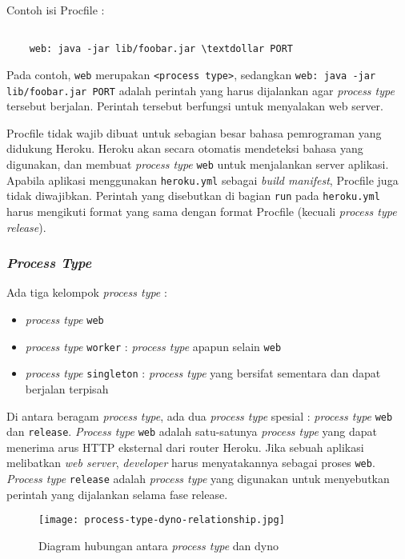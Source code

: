 Contoh isi Procfile :
\begin{lstlisting}

	web: java -jar lib/foobar.jar \textdollar PORT

\end{lstlisting}

Pada contoh, \texttt{web} merupakan \texttt{<process type>}, sedangkan \texttt{web: java -jar lib/foobar.jar \textdollar PORT} adalah perintah yang harus dijalankan agar \textit{process type} tersebut berjalan. Perintah tersebut berfungsi untuk menyalakan web server.

Procfile tidak wajib dibuat untuk sebagian besar bahasa pemrograman yang didukung Heroku. Heroku akan secara otomatis mendeteksi bahasa yang digunakan, dan membuat \textit{process type} \texttt{web} untuk menjalankan server aplikasi. Apabila aplikasi menggunakan \texttt{heroku.yml} sebagai \textit{build manifest}, Procfile juga tidak diwajibkan. Perintah yang disebutkan di bagian \texttt{run} pada \texttt{heroku.yml} harus mengikuti format yang sama dengan format Procfile (kecuali \textit{process type} \textit{release}).


\subsubsection{\textit{Process Type}}
Ada tiga kelompok \textit{process type} : 
\begin{itemize}
\item \textit{process type} \texttt{web}
\item \textit{process type} \texttt{worker} : \textit{process type} apapun selain \texttt{web}
\item \textit{process type} \texttt{singleton} : \textit{process type} yang bersifat sementara dan dapat berjalan terpisah
\end{itemize}

Di antara beragam \textit{process type}, ada dua \textit{process type} spesial : \textit{process type} \texttt{web} dan \texttt{release}. \textit{Process type} \texttt{web} adalah satu-satunya \textit{process type} yang dapat menerima arus HTTP eksternal dari router Heroku. Jika sebuah aplikasi melibatkan \textit{web server}, \textit{developer} harus menyatakannya sebagai proses \texttt{web}. \textit{Process type} \texttt{release} adalah \textit{process type} yang digunakan untuk menyebutkan perintah yang dijalankan selama fase release.

\begin{figure}[H]
	\centering  
	\texttt{[image: process-type-dyno-relationship.jpg]}  
	\caption[Diagram hubungan antara \textit{process type} dan dyno]{Diagram hubungan antara \textit{process type} dan dyno} 
	\label{fig:process-type-dyno-relationship} 
\end{figure}

